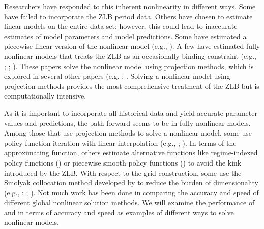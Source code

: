 \documentclass[12pt, final]{article}
\begin{document}
Researchers have responded to this inherent
nonlinearity in different ways. Some have failed to incorporate the ZLB period data. Others have
chosen to estimate linear models on the entire data set; however, this could lead to inaccurate estimates
of model parameters and model predictions. Some have estimated a piecewise linear version of the nonlinear model (e.g., \hyperlink{Guerrieri}{\color{black}{Guerrieri and Iacoviello, 2017}}). A few have estimated fully nonlinear models that treats the
	ZLB as an occasionally binding constraint (e.g., \hyperlink{Gust}{\color{black}{Gust et al.,\ 2017}}; \hyperlink{Plante}{\color{black}{Plante et al.,\ 2018}}; \hyperlink{RT}{\color{black}{Richter and Throckmorton, 2016}}). These papers solve the nonlinear model using projection methods, which is explored in several other papers (e.g. \hyperlink{Aruoba}{\color{black}{Aruoba et al.,\ 2018}}; \hyperlink{Fernandez}{\color{black}{Ferna\'ndez-Villaverde et al.,\ 2015)}}. Solving a nonlinear model using projection methods provides the most comprehensive treatment of the ZLB but is computationally intensive.

As it is important to incorporate all historical data and yield accurate parameter values and predictions, the path forward seems to be in fully nonlinear models. Among those that use projection methods to solve a nonlinear model, some use policy function iteration with linear interpolation (e.g., \hyperlink{Plante}{\color{black}{Plante et al.,\ 2018}}; \hyperlink{RT}{\color{black}{Richter and Throckmorton, 2016}}). In terms of the approximating function, others estimate alternative functions like regime-indexed policy functions (\hyperlink{Gust}{\color{black}{Gust et al.,\ 2017}}) or piecewise smooth policy functions (\hyperlink{Aruoba}{\color{black}{Aruoba et al.\ 2018}}) to avoid the kink introduced by the ZLB.  With respect to the grid construction, some use the Smolyak collocation method developed by \hyperlink{Judd}{\color{black}{Judd et al.\ (2010)}} to reduce the burden of dimensionality (e.g., \hyperlink{Gust}{\color{black}{Gust et al.,\ 2017}}; \hyperlink{Fernandez}{\color{black}{Ferna\'ndez-Villaverde et al.\, 2015}}; \hyperlink{Aruoba}{\color{black}{Aruoba et al.,\ 2018}}).
Not much work has been done in comparing the accuracy and speed of different global nonlinear solution methods. We will  examine the performance of \hyperlink{Atkinson}{\color{black}{Atkinson et al.\ (2019)}} and \hyperlink{Gust}{\color{black}{Gust et al.\ (2017)}} in terms of accuracy and speed as examples of different ways to solve nonlinear models. 
\end{document}
